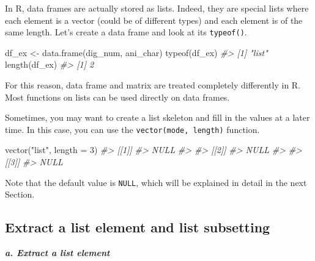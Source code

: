 \documentclass[
]{book}
\newenvironment{Shaded}{\begin{snugshade}}{\end{snugshade}}
\newcommand{\AttributeTok}[1]{\textcolor[rgb]{0.77,0.63,0.00}{#1}}
\newcommand{\CommentTok}[1]{\textcolor[rgb]{0.56,0.35,0.01}{\textit{#1}}}
\newcommand{\DecValTok}[1]{\textcolor[rgb]{0.00,0.00,0.81}{#1}}
\newcommand{\FunctionTok}[1]{\textcolor[rgb]{0.00,0.00,0.00}{#1}}
\newcommand{\NormalTok}[1]{#1}
\newcommand{\OtherTok}[1]{\textcolor[rgb]{0.56,0.35,0.01}{#1}}
\newcommand{\StringTok}[1]{\textcolor[rgb]{0.31,0.60,0.02}{#1}}
\newenvironment{blackbox}{
  \definecolor{shadecolor}{rgb}{0, 0, 0}  %
  \color{white}
  \begin{shaded}}
 {\end{shaded}}
\newenvironment{infobox}[1]
  {
  \begin{itemize}
  \renewcommand{\labelitemi}{
    \raisebox{-.7\height}[0pt][0pt]{
      {\setkeys{Gin}{width=3em,keepaspectratio}
        \texttt{[image: pics/\#1]}}
    }
  }
  \setlength{\fboxsep}{1em}
  \begin{blackbox}
  \item
  }
  {
  \end{blackbox}
  \end{itemize}
  }
\begin{document}
\begin{infobox}{caution}
In R, data frames are actually stored as lists. Indeed, they are special lists where each element is a vector (could be of different types) and each element is of the same length. Let's create a data frame and look at its \texttt{typeof()}.

\begin{Shaded}
\begin{Highlighting}[]
\NormalTok{df\_ex }\OtherTok{\textless{}{-}} \FunctionTok{data.frame}\NormalTok{(dig\_num, ani\_char)}
\FunctionTok{typeof}\NormalTok{(df\_ex)}
\CommentTok{\#\textgreater{} [1] "list"}
\FunctionTok{length}\NormalTok{(df\_ex)}
\CommentTok{\#\textgreater{} [1] 2}
\end{Highlighting}
\end{Shaded}

For this reason, data frame and matrix are treated completely differently in R. Most functions on lists can be used directly on data frames.

\end{infobox}

Sometimes, you may want to create a list skeleton and fill in the values at a later time. In this case, you can use the \texttt{vector(mode,\ length)} function.

\begin{Shaded}
\begin{Highlighting}[]
\FunctionTok{vector}\NormalTok{(}\StringTok{"list"}\NormalTok{, }\AttributeTok{length =} \DecValTok{3}\NormalTok{)}
\CommentTok{\#\textgreater{} [[1]]}
\CommentTok{\#\textgreater{} NULL}
\CommentTok{\#\textgreater{} }
\CommentTok{\#\textgreater{} [[2]]}
\CommentTok{\#\textgreater{} NULL}
\CommentTok{\#\textgreater{} }
\CommentTok{\#\textgreater{} [[3]]}
\CommentTok{\#\textgreater{} NULL}
\end{Highlighting}
\end{Shaded}

Note that the default value is \texttt{NULL}, which will be explained in detail in the next Section.

\hypertarget{extract-a-list-element-and-list-subsetting}{%
\subsection{Extract a list element and list subsetting}\label{extract-a-list-element-and-list-subsetting}}

\textbf{\emph{a. Extract a list element}}
\end{document}
